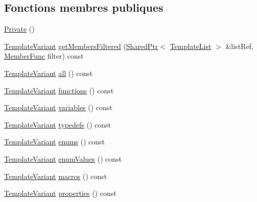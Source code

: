 \subsection*{Fonctions membres publiques}
\begin{DoxyCompactItemize}
\item 
\hyperlink{class_namespace_members_index_context_1_1_private_a103ceb387ad802e834df175c8d3dc941}{Private} ()
\item 
\hyperlink{class_template_variant}{Template\+Variant} \hyperlink{class_namespace_members_index_context_1_1_private_ad8918e6b83c68d7ff97c298b37f3b62d}{get\+Members\+Filtered} (\hyperlink{class_shared_ptr}{Shared\+Ptr}$<$ \hyperlink{class_template_list}{Template\+List} $>$ \&list\+Ref, \hyperlink{class_namespace_members_index_context_1_1_private_a40a77005bcf88756302b2ebf92a88a8e}{Member\+Func} filter) const 
\item 
\hyperlink{class_template_variant}{Template\+Variant} \hyperlink{class_namespace_members_index_context_1_1_private_aaeb13170fbbf7b7c0f23a55944fb675a}{all} () const 
\item 
\hyperlink{class_template_variant}{Template\+Variant} \hyperlink{class_namespace_members_index_context_1_1_private_a3b3472518332965980351bf92a0226ac}{functions} () const 
\item 
\hyperlink{class_template_variant}{Template\+Variant} \hyperlink{class_namespace_members_index_context_1_1_private_a26e8fd81b5995bcf0c8bad85de32d5d6}{variables} () const 
\item 
\hyperlink{class_template_variant}{Template\+Variant} \hyperlink{class_namespace_members_index_context_1_1_private_aec93a4de8a27f447d703ecf0606e9827}{typedefs} () const 
\item 
\hyperlink{class_template_variant}{Template\+Variant} \hyperlink{class_namespace_members_index_context_1_1_private_ab08b9c9f239e02e536d76e6a50bb8fd8}{enums} () const 
\item 
\hyperlink{class_template_variant}{Template\+Variant} \hyperlink{class_namespace_members_index_context_1_1_private_a05838159005b1000939f68dfef2adc5c}{enum\+Values} () const 
\item 
\hyperlink{class_template_variant}{Template\+Variant} \hyperlink{class_namespace_members_index_context_1_1_private_a9b99a3cb224755580fc3c8be45c13266}{macros} () const 
\item 
\hyperlink{class_template_variant}{Template\+Variant} \hyperlink{class_namespace_members_index_context_1_1_private_a77776d9248dedbc1f1a2b07520a25433}{properties} () const 

\end{DoxyCompactItemize}
